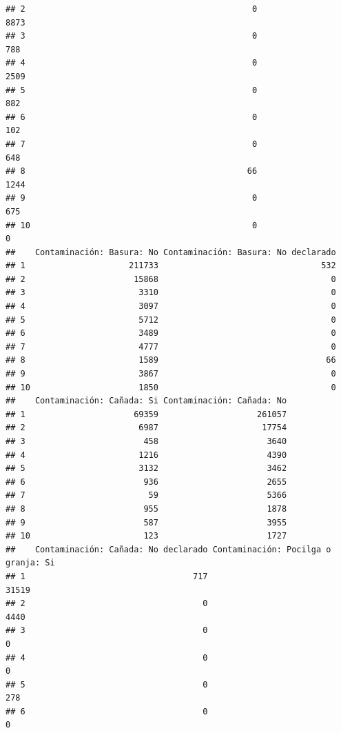\documentclass[11pt,]{article}
\begin{document}
\begin{verbatim}
## 2                                              0                      8873
## 3                                              0                       788
## 4                                              0                      2509
## 5                                              0                       882
## 6                                              0                       102
## 7                                              0                       648
## 8                                             66                      1244
## 9                                              0                       675
## 10                                             0                         0
##    Contaminación: Basura: No Contaminación: Basura: No declarado
## 1                     211733                                 532
## 2                      15868                                   0
## 3                       3310                                   0
## 4                       3097                                   0
## 5                       5712                                   0
## 6                       3489                                   0
## 7                       4777                                   0
## 8                       1589                                  66
## 9                       3867                                   0
## 10                      1850                                   0
##    Contaminación: Cañada: Si Contaminación: Cañada: No
## 1                      69359                    261057
## 2                       6987                     17754
## 3                        458                      3640
## 4                       1216                      4390
## 5                       3132                      3462
## 6                        936                      2655
## 7                         59                      5366
## 8                        955                      1878
## 9                        587                      3955
## 10                       123                      1727
##    Contaminación: Cañada: No declarado Contaminación: Pocilga o granja: Si
## 1                                  717                               31519
## 2                                    0                                4440
## 3                                    0                                   0
## 4                                    0                                   0
## 5                                    0                                 278
## 6                                    0                                   0

\end{verbatim}
\end{document}
